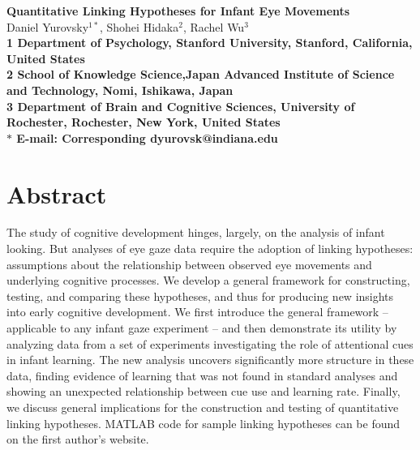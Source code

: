 \documentclass[12pt]{article}
\date{}
\begin{document}
\begin{flushleft}
{\Large
\textbf{Quantitative Linking Hypotheses for Infant Eye Movements}
}
\\
Daniel Yurovsky$^{1\ast}$, 
Shohei Hidaka$^{2}$, 
Rachel Wu$^{3}$
\\
\bf{1} Department of Psychology, Stanford University, Stanford, California, United States
\\
\bf{2} School of Knowledge Science,Japan Advanced Institute of Science and Technology, Nomi, Ishikawa, Japan
\\
\bf{3} Department of Brain and Cognitive Sciences, University of Rochester, Rochester, New York, United States
\\
$\ast$ E-mail: Corresponding dyurovsk@indiana.edu
\end{flushleft}

\section*{Abstract}
The study of cognitive development hinges, largely, on the analysis of infant looking. But analyses of eye gaze data require the adoption of linking hypotheses: assumptions about the relationship between observed eye movements and underlying cognitive processes. We develop a general framework for constructing, testing, and comparing these hypotheses, and thus for producing new insights into early cognitive development. We first introduce the general framework – applicable to any infant gaze experiment – and then demonstrate its utility by analyzing data from a set of experiments investigating the role of attentional cues in infant learning. The new analysis uncovers significantly more structure in these data, finding evidence of learning that was not found in standard analyses and showing an unexpected relationship between cue use and learning rate. Finally, we discuss general implications for the construction and testing of quantitative linking hypotheses. MATLAB code for sample linking hypotheses can be found on the first author’s website.

\end{document}

